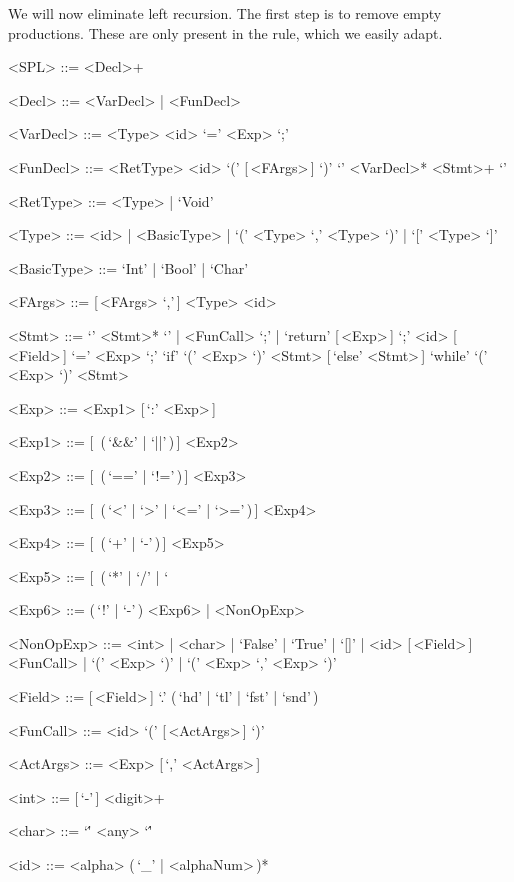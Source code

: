 \documentclass{article}
\begin{document}
We will now eliminate left recursion.
The first step is to remove empty productions.
These are only present in the  rule, which we easily adapt.
\begin{grammar}
    <SPL> ::= <Decl>+

    <Decl> ::= <VarDecl> | <FunDecl>

    <VarDecl> ::= <Type> <id> `=' <Exp> `;'

    <FunDecl> ::= <RetType> <id> `(' [\,<FArgs>\,] `)' `{' <VarDecl>* <Stmt>+ `}'

    <RetType> ::= <Type> | `Void'

    <Type> ::= <id> | <BasicType> | `(' <Type> `,' <Type> `)' | `[' <Type> `]'

    <BasicType> ::= `Int' | `Bool' | `Char'

    <FArgs> ::= [\,<FArgs> `,'\,] <Type> <id>

    <Stmt> ::= `{' <Stmt>* `}' | <FunCall> `;' | `return' [\,<Exp>\,] `;'
    \alt <id> [\,<Field>\,] `=' <Exp> `;'
    \alt `if' `(' <Exp> `)' <Stmt> [\,`else' <Stmt>\,]
    \alt `while' `(' <Exp> `)' <Stmt>

    <Exp> ::= <Exp1> [\,`:' <Exp>\,]

    <Exp1> ::= [\,<Exp1> (\,`&&' | `||'\,)\,] <Exp2>

    <Exp2> ::= [\,<Exp2> (\,`==' | `!='\,)\,] <Exp3>

    <Exp3> ::= [\,<Exp3> (\,`<' | `>' | `<=' | `>='\,)\,] <Exp4>

    <Exp4> ::= [\,<Exp4> (\,`+' | `-'\,)\,] <Exp5>

    <Exp5> ::= [\,<Exp5> (\,`*' | `/' | `%

    <Exp6> ::= (\,`!' | `-'\,) <Exp6> | <NonOpExp>

    <NonOpExp> ::= <int> | <char> | `False' | `True' | `[]' | <id> [\,<Field>\,]
    \alt <FunCall> | `(' <Exp> `)' | `(' <Exp> `,' <Exp> `)'

    <Field> ::= [\,<Field>\,] `.' (\,`hd' | `tl' | `fst' | `snd'\,)

    <FunCall> ::= <id> `(' [\,<ActArgs>\,] `)'

    <ActArgs> ::= <Exp> [\,`,' <ActArgs>\,]

    <int> ::= [\,`-'\,] <digit>+

    <char> ::= `\'' <any> `\''

    <id> ::= <alpha> (\,`_' | <alphaNum>\,)*
\end{grammar}
\end{document}
